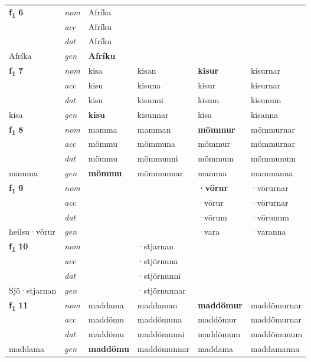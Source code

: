 \begin{longtable}[l]{X>{\footnotesize\itshape}XXXXX}
\multirow{3}{*}{{{\textbf{f{\textsubscript{1}}} \Large{\textbf{6}}}}} & nom & Afríka &  & \textbf{} &  \\*
 & acc & Afríku &  &  &  \\*
 & dat & Afríku &  &  &  \\*
 {\footnotesize{Afríka}} & gen & \textbf{Afríku} &  &  &  \\
\cmidrule{1-6}

\multirow{3}{*}{{{\textbf{f{\textsubscript{1}}} \Large{\textbf{7}}}}} & nom & kisa & kisan & \textbf{kisur} & kisurnar \\*
 & acc & kisu & kisuna & kisur & kisurnar \\*
 & dat & kisu & kisunni & kisum & kisunum \\*
 {\footnotesize{kisa}} & gen & \textbf{kisu} & kisunnar & kisa & kisanna \\
\cmidrule{1-6}

\multirow{3}{*}{{{\textbf{f{\textsubscript{1}}} \Large{\textbf{8}}}}} & nom & mamma & mamman & \textbf{mömmur} & mömmurnar \\*
 & acc & mömmu & mömmuna & mömmur & mömmurnar \\*
 & dat & mömmu & mömmunni & mömmum & mömmunum \\*
 {\footnotesize{mamma}} & gen & \textbf{mömmu} & mömmunnar & mamma & mammanna \\
\cmidrule{1-6}

\multirow{3}{*}{{{\textbf{f{\textsubscript{1}}} \Large{\textbf{9}}}}} & nom &  &  & \textbf{·vörur} & ·vörurnar \\*
 & acc &  &  & ·vörur & ·vörurnar \\*
 & dat &  &  & ·vörum & ·vörunum \\*
 {\footnotesize{heilsu\allowbreak ·vörur}} & gen & \textbf{} &  & ·vara & ·varanna \\
\cmidrule{1-6}

\multirow{3}{*}{{{\textbf{f{\textsubscript{1}}} \Large{\textbf{10}}}}} & nom &  & ·stjarnan & \textbf{} &  \\*
 & acc &  & ·stjörnuna &  &  \\*
 & dat &  & ·stjörnunni &  &  \\*
 {\footnotesize{Sjö\allowbreak ·stjarnan}} & gen & \textbf{} & ·stjörnunnar &  &  \\
\cmidrule{1-6}

\multirow{3}{*}{{{\textbf{f{\textsubscript{1}}} \Large{\textbf{11}}}}} & nom & maddama & maddaman & \textbf{maddömur} & maddömurnar \\*
 & acc & maddömu & maddömuna & maddömur & maddömurnar \\*
 & dat & maddömu & maddömunni & maddömum & maddömunum \\*
 {\footnotesize{maddama}} & gen & \textbf{maddömu} & maddömunnar & maddama & maddamanna \\
\cmidrule{1-6}


\end{longtable}
